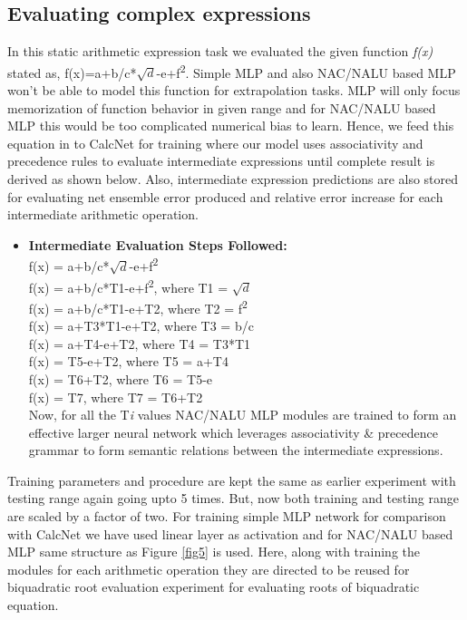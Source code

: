 \documentclass[conference]{IEEEtran}
\begin{document}
\subsection{Evaluating complex expressions}

In this static arithmetic expression task we evaluated the given function \textit{f(x)} stated as, f(x)=a+b/c*$\sqrt{d}$-e+f\textsuperscript{2}. Simple MLP and also NAC/NALU based MLP won't be able to model this function for extrapolation tasks. MLP will only focus memorization of function behavior in given range and for NAC/NALU based MLP this would be too complicated numerical bias to learn. Hence, we feed this equation in to CalcNet for training where our model uses associativity and precedence rules to evaluate intermediate expressions until complete result is derived as shown below. Also, intermediate expression predictions are also stored for evaluating net ensemble error produced and relative error increase for each intermediate arithmetic operation.

\begin{itemize}
\item \textbf{Intermediate Evaluation Steps Followed:} \\
f(x) = a+b/c*$\sqrt{d}$-e+f\textsuperscript{2} \\
f(x) = a+b/c*T1-e+f\textsuperscript{2}, where T1 = $\sqrt{d}$ \\
f(x) = a+b/c*T1-e+T2, where T2 = f\textsuperscript{2} \\
f(x) = a+T3*T1-e+T2, where T3 = b/c \\
f(x) = a+T4-e+T2, where T4 = T3*T1 \\
f(x) = T5-e+T2, where T5 = a+T4 \\
f(x) = T6+T2, where T6 = T5-e \\
f(x) = T7, where T7 = T6+T2 \\

Now, for all the T\textit{i} values NAC/NALU MLP modules are trained to form an effective larger neural network which leverages associativity \& precedence grammar to form semantic relations between the intermediate expressions.
\end{itemize}

Training parameters and procedure are kept the same as earlier experiment with testing range again going upto 5 times. But, now both training and testing range are scaled by a factor of two. For training simple MLP network for comparison with CalcNet we have used linear layer as activation and for NAC/NALU based MLP same structure as Figure \ref{fig5} is used. Here, along with training the modules for each arithmetic operation they are directed to be reused for biquadratic root evaluation experiment for evaluating roots of biquadratic equation. 
\end{document}
